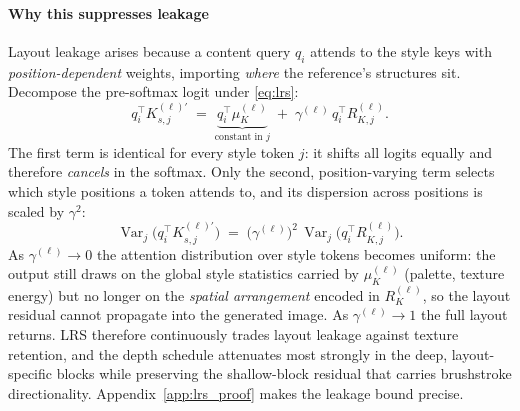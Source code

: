 \paragraph{Why this suppresses leakage}
Layout leakage arises because a content query $q_i$ attends to the style keys
with \emph{position-dependent} weights, importing \emph{where} the reference's
structures sit. Decompose the pre-softmax logit under \cref{eq:lrs}:
\begin{equation}
  q_i^\top K_{s,j}^{(\ell)\prime}
    \;=\; \underbrace{q_i^\top \mu_K^{(\ell)}}_{\text{constant in } j}
        \;+\; \gamma^{(\ell)}\, q_i^\top R_{K,j}^{(\ell)} .
  \label{eq:lrs_logit}
\end{equation}
The first term is identical for every style token $j$: it shifts all logits
equally and therefore \emph{cancels} in the softmax. Only the second,
position-varying term selects which style positions a token attends to, and its
dispersion across positions is scaled by $\gamma^2$:
\begin{equation}
  \operatorname{Var}_j\!\big(q_i^\top K_{s,j}^{(\ell)\prime}\big)
    \;=\; \big(\gamma^{(\ell)}\big)^2\,
          \operatorname{Var}_j\!\big(q_i^\top R_{K,j}^{(\ell)}\big).
  \label{eq:lrs_var}
\end{equation}
As $\gamma^{(\ell)}\!\to\!0$ the attention distribution over style tokens
becomes uniform: the output still draws on the global style statistics carried by
$\mu_K^{(\ell)}$ (palette, texture energy) but no longer on the \emph{spatial
arrangement} encoded in $R_K^{(\ell)}$, so the layout residual cannot propagate
into the generated image. As $\gamma^{(\ell)}\!\to\!1$ the full layout returns.
LRS therefore continuously trades layout leakage against texture retention, and
the depth schedule attenuates most strongly in the deep, layout-specific blocks
while preserving the shallow-block residual that carries brushstroke
directionality. Appendix~\ref{app:lrs_proof} makes the leakage bound precise.

